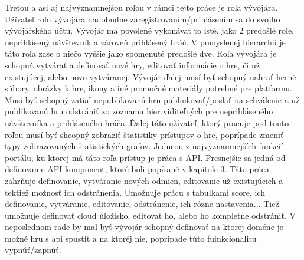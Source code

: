 Treťou a asi aj najvýznamnejšou roľou v rámci tejto práce je roľa vývojára. Užívateľ roľu vývojára nadobudne zaregistrovaním/prihlásením sa do svojho vývojářského účtu. Vývojár má povolené vykonávať to isté, jako 2 predošlé roľe, neprihlásený návštevník a zároveň prihlásený hráč. V pomyslenej hierarchií je táto roľa zase o niečo vyššie jako spomenuté predošlé dve. Roľa vývojára je schopná vytvárať a definovať nové hry, editovať informácie o hre, či už existujúcej, alebo novo vytváranej. Vývojár ďalej musí byť schopný nahrať herné súbory, obrázky k hre, ikony a iné promočné materiály potrebné pre platformu. Musí byť schopný zatiaľ nepublikovanú hru publiukovať/poslať na schválenie a už publikovanú hru odstrániť zo zoznamu hier viditeľných pre neprihláseného návštevníka a prihláseného hráča. Ďalej táto užívateľ, ktorý pracuje pod touto roľou musí byť shcopný zobraziť štatistiky prístupov o hre, poprípade zmeniť typy zobrazovaných štatistických grafov. Jedneou z najvýznamnejších funkcií portálu, ku ktorej má táto roľa prístup je práca s API. Presnejšie sa jedná od definovanie API komponent, ktoré boli popísané v kapitole 3. Táto práca zahrňuje definovanie, vytváranie nových odmien, editovanie už existujúcich a tektiež možnosť ich odstránenia. Umožnuje prácu s tabuľkami score, ich definovanie, vytváranie, editovanie, odstránenie, ich rôzne nastavenia... Tiež umožnuje definovať cloud úložisko, editovať ho, alebo ho kompletne odstrániť. V neposlednom rade by mal byť vývojár schopný definovať na ktorej doméne je možné hru s api spustiť a na ktoréj nie, poprípade túto fuinkcionalitu vypnúť/zapnúť. 
